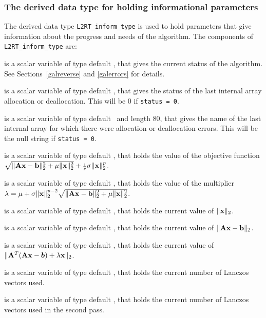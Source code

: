 \documentclass{galahad}
\newcommand{\packagename}{L2\-RT}
\begin{document}

\subsubsection{The derived data type for holding informational
 parameters}\label{typeinform}
The derived data type
{\tt \packagename\_inform\_type}
is used to hold parameters that give information about the progress and needs
of the algorithm. The components of
{\tt \packagename\_inform\_type}
are:

\begin{description}
 is a scalar variable of type default \integer, that gives the
current status of the algorithm. See Sections~\ref{galreverse} and
\ref{galerrors} for details.

 is a scalar variable of type default \integer,
that gives the status of the last internal array allocation
or deallocation. This will be 0 if {\tt status = 0}.

 is a scalar variable of type default \character\
and length 80, that  gives the name of the last internal array
for which there were allocation or deallocation errors.
This will be the null string if {\tt status = 0}.

 is a scalar variable of type default
\realdp, that holds the value of the objective function
$\sqrt{\| {\mathbf{A}} {\mathbf{x}} - {\mathbf{b}}\|_2^2 + \mu \| {\mathbf{x}} \|_2^2}
 + {\scriptstyle \frac{1}{p}} \sigma \| {\mathbf{x}} \|_2^p$.

 is a scalar variable of type default
\realdp, that holds the value of the multiplier
$\lambda = \mu + \sigma \|{\mathbf{x}}\|_2^{p-2}
 \sqrt{\| {\mathbf{A}} {\mathbf{x}} - {\mathbf{b}} \|_2^2 + \mu \|{\mathbf{x}}\|_2^2}$.

 is a scalar variable of type default \realdp,
that holds the current value of $\|{\mathbf{x}}\|_2$.

 is a scalar variable of type default \realdp,
that holds the current value of
$\| {\mathbf{A}} {\mathbf{x}} - {\mathbf{b}} \|_2$.

 is a scalar variable of type default \realdp,
that holds the current value of
$\|{\mathbf{A}}^T ( {\mathbf{A}} {\mathbf{x}} - \bm b ) + \lambda {\mathbf{x}} \|_2$.

 is a scalar variable of type default \integer, that holds the
current number of Lanczos vectors used.

 is a scalar variable of type default \integer, that holds the
current number of Lanczos vectors used in the second pass.

\end{description}
\end{document}
